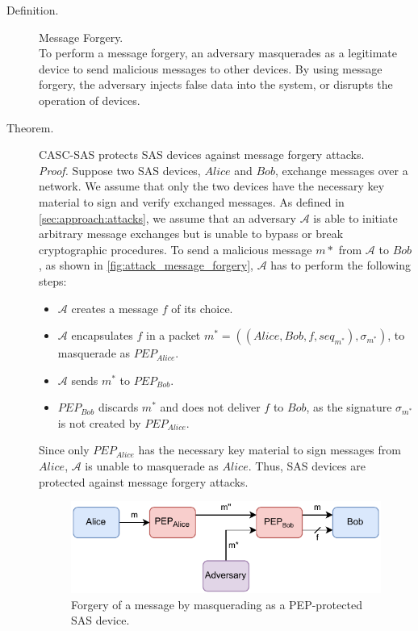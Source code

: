 \begin{description}
    \item[Definition.] Message Forgery.\\
    To perform a message forgery, an adversary masquerades as a legitimate device to send malicious messages to other devices.
    By using message forgery, the adversary injects false data into the system, or disrupts the operation of devices.

    \item[Theorem.] CASC-SAS protects SAS devices against message forgery attacks.\\
    \textit{Proof.} Suppose two SAS devices, $Alice$ and $Bob$, exchange messages over a network.
    We assume that only the two devices have the necessary key material to sign and verify exchanged messages.
    As defined in \autoref{sec:approach:attacks}, we assume that an adversary $\mathcal{A}$ is able to initiate arbitrary message exchanges but is unable to bypass or break cryptographic procedures.
    To send a malicious message $m*$ from $\mathcal{A}$ to $Bob$, as shown in \autoref{fig:attack_message_forgery}, $\mathcal{A}$ has to perform the following steps:
    \begin{itemize}
        \item $\mathcal{A}$ creates a message $f$ of its choice.
        \item $\mathcal{A}$ encapsulates $f$ in a packet $m^* = ((Alice, Bob, f, seq_{m^*}), \sigma_{m^*})$, to masquerade as $PEP_{Alice}$.
        \item $\mathcal{A}$ sends $m^*$ to $PEP_{Bob}$.
        \item $PEP_{Bob}$ discards $m^*$ and does not deliver $f$ to $Bob$, as the signature $\sigma_{m^*}$ is not created by $PEP_{Alice}$.
    \end{itemize}
    Since only $PEP_{Alice}$ has the necessary key material to sign messages from $Alice$, $\mathcal{A}$ is unable to masquerade as $Alice$.
    Thus, SAS devices are protected against message forgery attacks.
    \begin{figure}
        \centering
        \includegraphics[width=0.75\linewidth]{figures/attack_message_forgery.drawio.pdf}
        \caption{Forgery of a message by masquerading as a PEP-protected SAS device.}
        \label{fig:attack_message_forgery}
    \end{figure}


\end{description}
